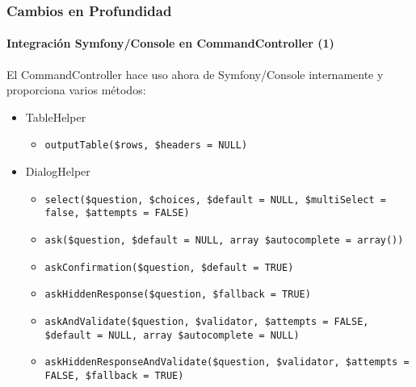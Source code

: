 \begin{frame}[fragile]
	\frametitle{Cambios en Profundidad}
	\framesubtitle{Integración Symfony/Console en CommandController (1)}

	\lstset{basicstyle=\tiny\ttfamily}

	El CommandController hace uso ahora de Symfony/Console internamente y proporciona varios métodos:

	\begin{itemize}

		\item \smaller TableHelper
			\begin{itemize}
				\item\smaller\texttt{outputTable(\$rows, \$headers = NULL)}
			\end{itemize}

		\item DialogHelper
			\begin{itemize}
				\item\smaller\texttt{select(\$question, \$choices, \$default = NULL, \$multiSelect = false, \$attempts = FALSE)}
				\item\texttt{ask(\$question, \$default = NULL, array \$autocomplete = array())}
				\item\texttt{askConfirmation(\$question, \$default = TRUE)}
				\item\texttt{askHiddenResponse(\$question, \$fallback = TRUE)}
				\item\texttt{askAndValidate(\$question, \$validator, \$attempts = FALSE, \$default = NULL, array \$autocomplete = NULL)}
				\item\texttt{askHiddenResponseAndValidate(\$question, \$validator, \$attempts = FALSE, \$fallback = TRUE)}
			\end{itemize}

	\end{itemize}

\end{frame}


